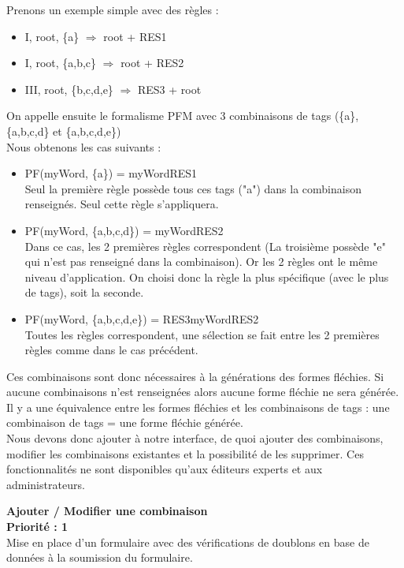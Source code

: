 \documentclass[12pt,a4paper]{article}
\begin{document}
    \smallbreak

    Prenons un exemple simple avec des règles :
    \begin{itemize}
        \item I, root, \{a\} $\Longrightarrow$ root + RES1
        \item I, root, \{a,b,c\} $\Longrightarrow$ root + RES2
        \item III, root, \{b,c,d,e\} $\Longrightarrow$ RES3 + root
    \end{itemize}
    On appelle ensuite le formalisme PFM avec 3 combinaisons de tags (\{a\}, \{a,b,c,d\} et \{a,b,c,d,e\}) \\
    Nous obtenons les cas suivants :
    \begin{itemize}
        \item PF(myWord, \{a\}) = myWordRES1 \\
        Seul la première règle possède tous ces tags ("a") dans la combinaison renseignés. Seul cette règle s'appliquera.
        \item PF(myWord, \{a,b,c,d\}) = myWordRES2 \\
        Dans ce cas, les 2 premières règles correspondent (La troisième possède "e" qui n'est pas renseigné dans la combinaison). Or les 2 règles ont le même niveau d'application. On choisi donc la règle la plus spécifique (avec le plus de tags), soit la seconde.
        \item PF(myWord, \{a,b,c,d,e\}) = RES3myWordRES2 \\
        Toutes les règles correspondent, une sélection se fait entre les 2 premières règles comme dans le cas précédent.
    \end{itemize}

    \smallbreak

    Ces combinaisons sont donc nécessaires à la générations des formes fléchies. Si aucune combinaisons n'est renseignées alors aucune forme fléchie ne sera générée. Il y a une équivalence entre les formes fléchies et les combinaisons de tags : une combinaison de tags = une forme fléchie générée.
    \\
    Nous devons donc ajouter à notre interface, de quoi ajouter des combinaisons, modifier les combinaisons existantes et la possibilité de les supprimer. Ces fonctionnalités ne sont disponibles qu'aux éditeurs experts et aux administrateurs.

    \smallbreak

    \textbf{Ajouter / Modifier une combinaison}  \\
    \textbf{Priorité : 1} \\
    Mise en place d'un formulaire avec des vérifications de doublons en base de données à la soumission du formulaire.
\end{document}
